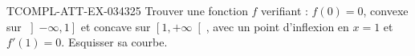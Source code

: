 \begin{exercice}{TCOMPL-ATT-EX-034}{3}{25}
Trouver une fonction $f$ verifiant : $f(0)=0$, convexe sur $\left]-\infty, 1\right]$ et concave sur $\left[1, +\infty\right[$, avec un point d'inflexion en $x=1$ et $f'(1)=0$. Esquisser sa courbe.

\end{exercice}
